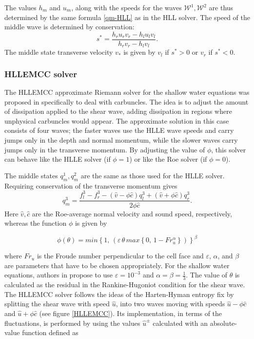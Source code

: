 \documentclass{article}
\newcommand{\W}{{\mathcal W}}
\begin{document}
The values $h_m$ and $u_m$, along with the speeds for the waves $\W^1,\W^2$ 
are thus determined by the same formula \eqref{qm-HLL} as in the HLL solver.
The speed of the middle wave is determined by conservation:
$$
    s^* = \frac{h_r u_r v_r - h_l u_l v_l}{h_r v_r - h_l v_l}.
$$
The middle state transverse velocity $v_*$ is given by $v_l$ if $s^*>0$ or $v_r$ if $s^*<0$.

\subsubsection{HLLEMCC solver}
The HLLEMCC approximate Riemann solver for the shallow water equations was proposed
in \cite{kemm2014note} specifically to deal with carbuncles.  The idea is to adjust
the amount of dissipation applied to the shear wave, adding dissipation in regions
where unphysical carbuncles would appear.  The approximate solution in this
case consists of four waves; the faster waves use the HLLE wave speeds and carry
jumps only in the depth and normal momentum, while the slower waves carry jumps
only in the transverse momentum.  By adjusting the value of $\phi$, this solver
can behave like the HLLE solver (if $\phi=1$) or like the Roe solver (if $\phi=0$).

The middle states $q^1_m, q^2_m$ are the same as those used for the HLLE solver.
Requiring conservation of the transverse momentum gives
$$
    q^3_m = \frac{f^3_l - f^3_r - (\hat{v}-\phi\hat{c})q^3_l + (\hat{v}+\phi\hat{c})q^3_r}{2\phi\hat{c}}.
$$
Here $\hat{v}, \hat{c}$ are the Roe-average normal velocity and sound speed, respectively, whereas the function $\phi$ is given by

\begin{equation}\label{if}
\phi(\theta)=min\left\lbrace 1,\, \left(\varepsilon\,\theta\,max\left\lbrace0,\,1-Fr_{u}^{\alpha} \right\rbrace \right)   \right\rbrace^{\beta}
\end{equation}

where $Fr_{u}$ is the Froude number perpendicular to the cell face and $\varepsilon$, $\alpha$, and $\beta$ are parameters that have to be chosen appropriately. For the shallow water equations, authors in \cite{kemm2014note} propose to use $\varepsilon=10^{-3}$ and $\alpha=\beta=\frac{1}{3}$. The value of $\theta$ is calculated as the residual in the Rankine-Hugoniot condition for the shear wave.\\

The HLLEMCC solver follows the ideas of the Harten-Hyman entropy fix by splitting the shear wave with speed $\hat{u}$, into two waves moving with speeds $\hat{u}-\phi\hat{c}$ and $\hat{u}+\phi\hat{c}$ (see figure \ref{HLLEMCC}). Its implementation, in terms of the fluctuations, is performed by using the values $\hat{u}^{\pm}$ calculated with an absolute-value function defined as
\end{document}
